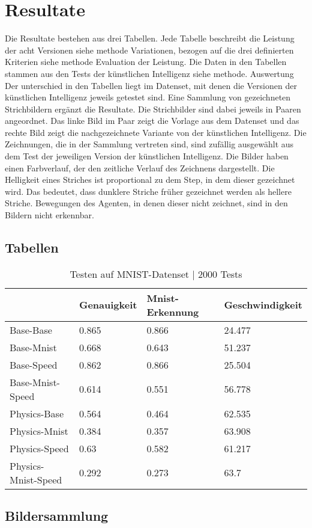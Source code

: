 \chapter{Resultate}
Die Resultate bestehen aus drei Tabellen. Jede Tabelle beschreibt die Leistung
der acht Versionen {siehe methode Variationen}, bezogen auf die drei definierten
Kriterien {siehe methode Evaluation der Leistung}. Die Daten in den Tabellen
stammen aus den Tests der künstlichen Intelligenz {siehe methode. Auswertung}
Der unterschied in den Tabellen liegt im Datenset, mit denen die Versionen der
künstlichen Intelligenz jeweils getestet sind. 
Eine Sammlung von gezeichneten Strichbildern ergänzt die Resultate. Die
Strichbilder sind dabei jeweils in Paaren angeordnet. Das linke Bild im Paar
zeigt die Vorlage aus dem Datenset und das rechte Bild zeigt die nachgezeichnete
Variante von der künstlichen Intelligenz. Die Zeichnungen, die in der Sammlung
vertreten sind, sind zufällig ausgewählt aus dem Test der jeweiligen Version der
künstlichen Intelligenz. Die Bilder haben einen Farbverlauf, der den zeitliche
Verlauf des Zeichnens dargestellt. Die Helligkeit eines Striches ist
proportional zu dem Step, in dem dieser gezeichnet wird. Das bedeutet, dass
dunklere Striche früher gezeichnet werden als hellere Striche. Bewegungen des
Agenten, in denen dieser nicht zeichnet, sind in den Bildern nicht erkennbar.

\newpage
\section{Tabellen}
\begin{table}[!ht]
    \centering
    \caption{Testen auf MNIST-Datenset | 2000 Tests}
    \begin{tabular}{|l|l|l|l|}
        \hline
            ~ & Genauigkeit & Mnist-Erkennung & Geschwindigkeit \\ \hline
            Base-Base & 0.865 & 0.866 & 24.477 \\ \hline
            Base-Mnist & 0.668 & 0.643 & 51.237 \\ \hline
            Base-Speed & 0.862 & 0.866 & 25.504 \\ \hline
            Base-Mnist-Speed & 0.614 & 0.551 & 56.778 \\ \hline
            Physics-Base & 0.564 & 0.464 & 62.535 \\ \hline
            Physics-Mnist & 0.384 & 0.357 & 63.908 \\ \hline
            Physics-Speed & 0.63 & 0.582 & 61.217 \\ \hline
            Physics-Mnist-Speed & 0.292 & 0.273 & 63.7 \\ \hline
        \end{tabular}
    \label{tab:MNIST}
\end{table}


\section{Bildersammlung}
